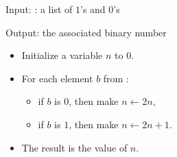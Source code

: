 \documentclass[11pt,class=report,crop=false]{standalone}
\begin{document}
\begin{activite}
\begin{enumerate}
  \begin{algorithme}
  Input:  : a list of $1$'s and $0$'s 
  
  Output: the associated binary number 

  \begin{itemize}
    \item Initialize a variable $n$ to $0$.

    
    \item For each element $b$ from  :
    
     \begin{itemize} 
       \item if $b$ is $0$, then make $n \leftarrow 2n$,
       \item if $b$ is $1$, then make $n \leftarrow 2n+1$.
     \end{itemize}    
         
    \item The result is the value of $n$.
  \end{itemize} 
             
 \end{algorithme}
 
\end{enumerate}

\end{activite}
  
  
\end{document}
